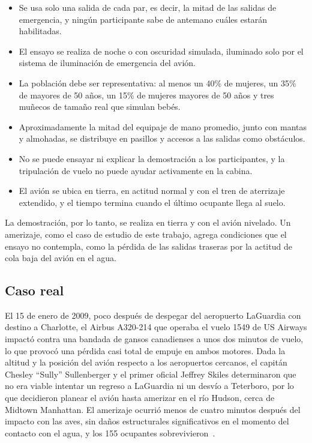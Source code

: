 \documentclass[a4paper, 11pt]{article}
\begin{document}
\begin{itemize}[leftmargin=2em]
    \item Se usa solo una salida de cada par, es decir, la mitad de las salidas de
          emergencia, y ning\'un participante sabe de antemano cu\'ales estar\'an
          habilitadas.
    \item El ensayo se realiza de noche o con oscuridad simulada, iluminado solo por
          el sistema de iluminaci\'on de emergencia del avi\'on.
    \item La poblaci\'on debe ser representativa: al menos un 40\% de mujeres, un
          35\% de mayores de 50 a\~nos, un 15\% de mujeres mayores de 50 a\~nos y tres
          mu\~necos de tama\~no real que simulan beb\'es.
    \item Aproximadamente la mitad del equipaje de mano promedio, junto con mantas y
          almohadas, se distribuye en pasillos y accesos a las salidas como
          obst\'aculos.
    \item No se puede ensayar ni explicar la demostraci\'on a los participantes, y la
          tripulaci\'on de vuelo no puede ayudar activamente en la cabina.
    \item El avi\'on se ubica en tierra, en actitud normal y con el tren de aterrizaje
          extendido, y el tiempo termina cuando el \'ultimo ocupante llega al suelo.
\end{itemize}

La demostraci\'on, por lo tanto, se realiza en tierra y con el avi\'on nivelado. Un
amerizaje, como el caso de estudio de este trabajo, agrega condiciones que el ensayo
no contempla, como la p\'erdida de las salidas traseras por la actitud de cola baja
del avi\'on en el agua.

\subsection{Caso real}

El 15 de enero de 2009, poco despu\'es de despegar del aeropuerto LaGuardia con
destino a Charlotte, el Airbus A320-214 que operaba el vuelo 1549 de US Airways
impact\'o contra una bandada de gansos canadienses a unos dos minutos de vuelo, lo
que provoc\'o una p\'erdida casi total de empuje en ambos motores. Dada la altitud
y la posici\'on del avi\'on respecto a los aeropuertos cercanos, el capit\'an
Chesley ``Sully'' Sullenberger y el primer oficial Jeffrey Skiles determinaron que
no era viable intentar un regreso a LaGuardia ni un desv\'io a Teterboro, por lo
que decidieron planear el avi\'on hasta amerizar en el r\'io Hudson, cerca de
Midtown Manhattan. El amerizaje ocurri\'o menos de cuatro minutos despu\'es del
impacto con las aves, sin da\~nos estructurales significativos en el momento del
contacto con el agua, y los 155 ocupantes sobrevivieron~\cite{wiki1549}.
\end{document}
